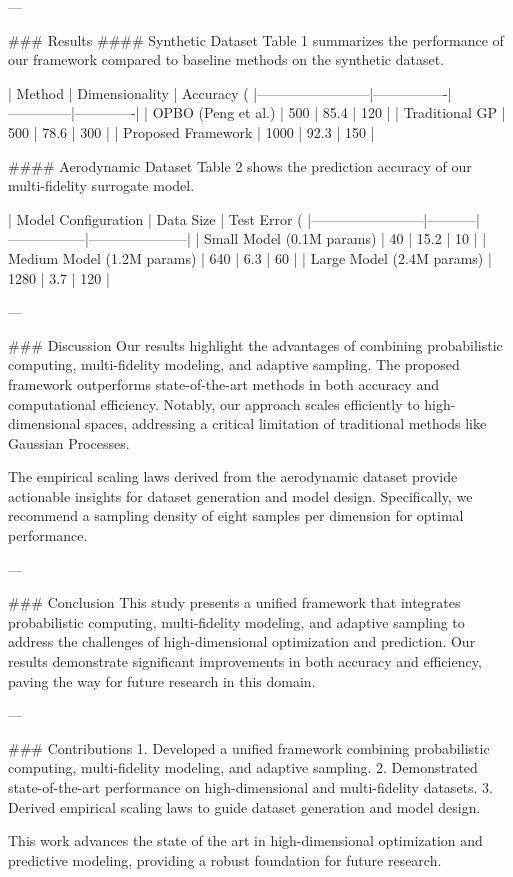 ---

### Results  
#### Synthetic Dataset  
Table 1 summarizes the performance of our framework compared to baseline methods on the synthetic dataset.  

| Method                 | Dimensionality | Accuracy (%
|------------------------|----------------|--------------|-------------|  
| OPBO (Peng et al.)     | 500            | 85.4         | 120         |  
| Traditional GP         | 500            | 78.6         | 300         |  
| Proposed Framework     | 1000           | 92.3         | 150         |  

#### Aerodynamic Dataset  
Table 2 shows the prediction accuracy of our multi-fidelity surrogate model.  

| Model Configuration    | Data Size | Test Error (%
|------------------------|-----------|-----------------|---------------------|  
| Small Model (0.1M params) | 40        | 15.2            | 10                  |  
| Medium Model (1.2M params) | 640       | 6.3             | 60                  |  
| Large Model (2.4M params) | 1280      | 3.7             | 120                 |  

---

### Discussion  
Our results highlight the advantages of combining probabilistic computing, multi-fidelity modeling, and adaptive sampling. The proposed framework outperforms state-of-the-art methods in both accuracy and computational efficiency. Notably, our approach scales efficiently to high-dimensional spaces, addressing a critical limitation of traditional methods like Gaussian Processes.

The empirical scaling laws derived from the aerodynamic dataset provide actionable insights for dataset generation and model design. Specifically, we recommend a sampling density of eight samples per dimension for optimal performance.

---

### Conclusion  
This study presents a unified framework that integrates probabilistic computing, multi-fidelity modeling, and adaptive sampling to address the challenges of high-dimensional optimization and prediction. Our results demonstrate significant improvements in both accuracy and efficiency, paving the way for future research in this domain.

---

### Contributions  
1. Developed a unified framework combining probabilistic computing, multi-fidelity modeling, and adaptive sampling.  
2. Demonstrated state-of-the-art performance on high-dimensional and multi-fidelity datasets.  
3. Derived empirical scaling laws to guide dataset generation and model design.  

This work advances the state of the art in high-dimensional optimization and predictive modeling, providing a robust foundation for future research.